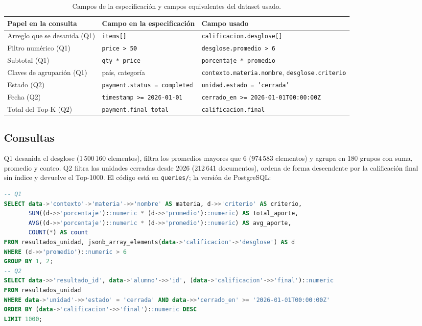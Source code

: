 \documentclass[11pt,letterpaper]{article}
\begin{document}
\begin{table}[H]\centering\footnotesize
\caption{Campos de la especificación y campos equivalentes del dataset usado.}
\label{tab:mapeo}
\begin{tabular}{lll}
\toprule
Papel en la consulta & Campo en la especificación & Campo usado \\
\midrule
Arreglo que se desanida (Q1) & \texttt{items[]} & \texttt{calificacion.desglose[]} \\
Filtro numérico (Q1) & \texttt{price > 50} & \texttt{desglose.promedio > 6} \\
Subtotal (Q1) & \texttt{qty * price} & \texttt{porcentaje * promedio} \\
Claves de agrupación (Q1) & país, categoría & \texttt{contexto.materia.nombre}, \texttt{desglose.criterio} \\
Estado (Q2) & \texttt{payment.status = completed} & \texttt{unidad.estado = 'cerrada'} \\
Fecha (Q2) & \texttt{timestamp >= 2026-01-01} & \texttt{cerrado\_en >= 2026-01-01T00:00:00Z} \\
Total del Top-K (Q2) & \texttt{payment.final\_total} & \texttt{calificacion.final} \\
\bottomrule
\end{tabular}
\end{table}

\subsection{Consultas}
Q1 desanida el desglose (1\,500\,160 elementos), filtra los promedios mayores que 6
(974\,583 elementos) y agrupa en 180 grupos con suma, promedio y conteo. Q2 filtra las unidades
cerradas desde 2026 (212\,641 documentos), ordena de forma descendente por la calificación final
sin índice y devuelve el Top-1000. El código está en \texttt{queries/}; la versión de PostgreSQL:

\begin{lstlisting}[language=SQL]
-- Q1
SELECT data->'contexto'->'materia'->>'nombre' AS materia, d->>'criterio' AS criterio,
       SUM((d->>'porcentaje')::numeric * (d->>'promedio')::numeric) AS total_aporte,
       AVG((d->>'porcentaje')::numeric * (d->>'promedio')::numeric) AS avg_aporte,
       COUNT(*) AS count
FROM resultados_unidad, jsonb_array_elements(data->'calificacion'->'desglose') AS d
WHERE (d->>'promedio')::numeric > 6
GROUP BY 1, 2;
-- Q2
SELECT data->>'resultado_id', data->'alumno'->>'id', (data->'calificacion'->>'final')::numeric
FROM resultados_unidad
WHERE data->'unidad'->>'estado' = 'cerrada' AND data->>'cerrado_en' >= '2026-01-01T00:00:00Z'
ORDER BY (data->'calificacion'->>'final')::numeric DESC
LIMIT 1000;
\end{lstlisting}
\end{document}
